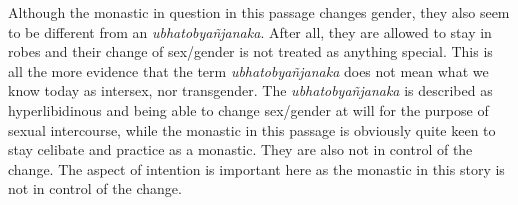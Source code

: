 Although the monastic in question in this passage changes gender, they also seem to be different from an {\em ubhatob­yañ­janaka}. After all, they are allowed to stay in robes and their change of sex/gender is not treated as anything special. This is all the more evidence that the term {\em ubhatob­yañ­janaka} does not mean what we know today as intersex, nor transgender. The {\em ubhatob­yañ­janaka} is described as hyperlibidinous and being able to change sex/gender at will for the purpose of sexual intercourse, while the monastic in this passage is obviously quite keen to stay celibate and practice as a monastic. They are also not in control of the change. The aspect of intention is important here as the monastic in this story is not in control of the change.